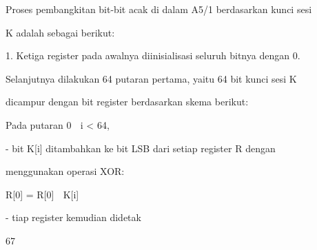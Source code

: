 \documentclass{article}
\begin{document}

Proses pembangkitan bit-bit acak di dalam A5/1 berdasarkan kunci sesi 

K adalah sebagai berikut:

1. Ketiga register pada awalnya diinisialisasi seluruh bitnya dengan 0. 

Selanjutnya dilakukan 64 putaran pertama, yaitu 64 bit kunci sesi K 

dicampur dengan bit register berdasarkan skema berikut: 


Pada putaran 0  i < 64, 

                 - bit K[i] ditambahkan ke bit LSB dari setiap register R dengan 

menggunakan operasi XOR:



R[0] = R[0]  K[i]

               - tiap register kemudian didetak

67
\end{document}
